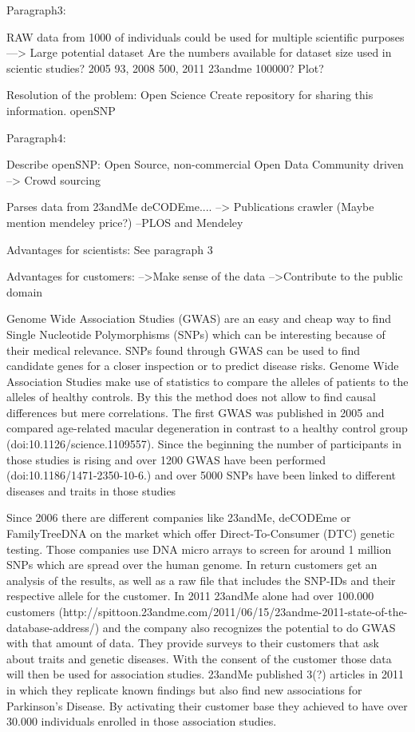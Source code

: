 \documentclass[10pt]{article}
\begin{document}
Paragraph3:

RAW data from 1000 of individuals could be used for multiple scientific
purposes
---> Large potential dataset Are the numbers available for dataset size used
in scientic studies? 2005 93, 2008 500, 2011 23andme 100000? Plot?

Resolution of the problem: Open Science
Create repository for sharing this information. openSNP


Paragraph4:

Describe openSNP:
Open Source, non-commercial
Open Data
Community driven --> Crowd sourcing


Parses data from 23andMe deCODEme....
--> Publications crawler (Maybe mention mendeley price?)
        --PLOS and Mendeley

Advantages for scientists: See paragraph 3

Advantages for customers: 
-->Make sense of the data
-->Contribute to the public domain



Genome Wide Association Studies (GWAS) are an easy and cheap way to find Single Nucleotide Polymorphisms (SNPs) which can be interesting because of their medical relevance. SNPs found through GWAS can be used to find candidate genes for a closer inspection or to predict disease risks. Genome Wide Association Studies make use of statistics to compare the alleles of patients to the alleles of healthy controls. By this the method does not allow to find causal differences but mere correlations. The first GWAS was published in 2005 and compared age-related macular degeneration in contrast to a healthy control group (doi:10.1126/science.1109557). Since the beginning the number of participants in those studies is rising and over 1200 GWAS have been performed (doi:10.1186/1471-2350-10-6.) and over 5000 SNPs have been linked to different diseases and traits in those studies %

Since 2006 there are different companies like 23andMe, deCODEme or FamilyTreeDNA on the market which offer Direct-To-Consumer (DTC) genetic testing. Those companies use DNA micro arrays to screen for around 1 million SNPs which are spread over the human genome. In return customers get an analysis of the results, as well as a raw file that includes the SNP-IDs and their respective allele for the customer. In 2011 23andMe alone had over 100.000 customers (http://spittoon.23andme.com/2011/06/15/23andme-2011-state-of-the-database-address/) and the company also recognizes the potential to do GWAS with that amount of data. They provide surveys to their customers that ask about traits and genetic diseases. With the consent of the customer those data will then be used for association studies. 23andMe published 3(?) articles in 2011 in which they replicate known findings but also find new associations for Parkinson's Disease. By activating their customer base they achieved to have over 30.000 individuals enrolled in those association studies.  
\end{document}
